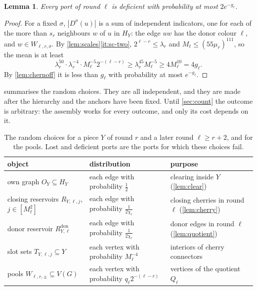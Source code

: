 \documentclass[11pt]{article}
\newtheorem{lemma}[theorem]{Lemma}
\theoremstyle{definition}
\theoremstyle{remark}
\numberwithin{equation}{section}
\numberwithin{figure}{section}
\numberwithin{table}{section}
\newcommand{\Rdon}{R^{\mathrm{don}}}
\begin{document}
\begin{lemma}\label{lem:deficient}
Every port of round $\ell$ is deficient with probability at most
$2e^{-g_\ell}$.
\end{lemma}

\begin{proof}
For a fixed $\sigma$, $|D^\sigma(u)|$ is a sum of independent indicators, one
for each of the more than $s_r$ neighbours $w$ of $u$ in $H_Y$: the edge $uw$
has the donor colour $\ell$, and $w\in W_{\ell,r,\sigma}$. By
\cref{lem:scales}\ref{it:sc-two}, $2^{\ell-r}\le\lambda_r$ and
$M_\ell\le(55\mu_r)^{111}$, so the mean is at least
\[
\lambda_r^{50}\cdot\lambda_r^{-4}\cdot M_\ell^{-5}2^{-(\ell-r)}
\ge\lambda_r^{45}M_\ell^{-5}\ge4M_\ell^{10}=4g_\ell.
\]
By \cref{lem:chernoff} it is less than $g_\ell$ with probability at most
$e^{-g_\ell}$.
\end{proof}

 summarises the random choices. They are all independent, and
they are made after the hierarchy and the anchors have been fixed. Until
\cref{sec:count} the outcome is arbitrary: the assembly works for every
outcome, and only its cost depends on it.

\begin{table}[h]
\centering\small
\renewcommand{\arraystretch}{1.15}
\begin{tabular}{@{}p{}p{}p{}@{}}
\toprule
object & distribution & purpose\\
\midrule
own graph $O_Y\subseteq H_Y$ & each edge with probability $\frac12$ & clearing inside $Y$ (\cref{lem:clear})\\
closing reservoirs $R_{Y,\ell,j}$, $j\in[M_\ell^2]$ & each edge with probability $\frac1{2\chi_r}$ & closing cherries in round $\ell$ (\cref{lem:cherry})\\
donor reservoir $\Rdon_{Y,\ell}$ & each edge with probability $\frac1{2\chi_r}$ & donor edges in round $\ell$ (\cref{lem:quotient})\\
slot sets $T_{Y,\ell,j}\subseteq Y$ & each vertex with probability $M_\ell^{-4}$ & interiors of cherry connectors\\
pools $W_{\ell,r,\pm}\subseteq V(G)$ & each vertex with probability $q_\ell2^{-(\ell-r)}$ & vertices of the quotient $Q_\ell$\\
\bottomrule
\end{tabular}
\caption{The random choices for a piece $Y$ of round $r$ and a later round
$\ell\ge r+2$, and for the pools. Lost and deficient ports are the ports for
which these choices fail.}
\label{tab:random}
\end{table}
\end{document}
